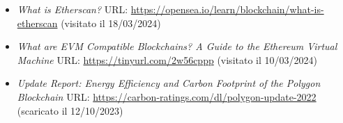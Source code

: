 \documentclass[a4paper, 12pt, italian]{extarticle}
\begin{document}
\begin{itemize}[topsep=5pt, itemsep=0pt]
    \item
    \textit{What is Etherscan?}\newline
    URL: \url{https://opensea.io/learn/blockchain/what-is-etherscan}\newline
    (visitato il 18/03/2024)

    \item
    \textit{What are EVM Compatible Blockchains? A Guide to the Ethereum Virtual Machine} URL: \url{https://tinyurl.com/2w56cppp}\newline
    (visitato il 10/03/2024)

    \item
    \textit{Update Report: Energy Efficiency and Carbon Footprint of the Polygon Blockchain} URL: \url{https://carbon-ratings.com/dl/polygon-update-2022}\newline
    (scaricato il 12/10/2023)

\end{itemize}
\end{document}
